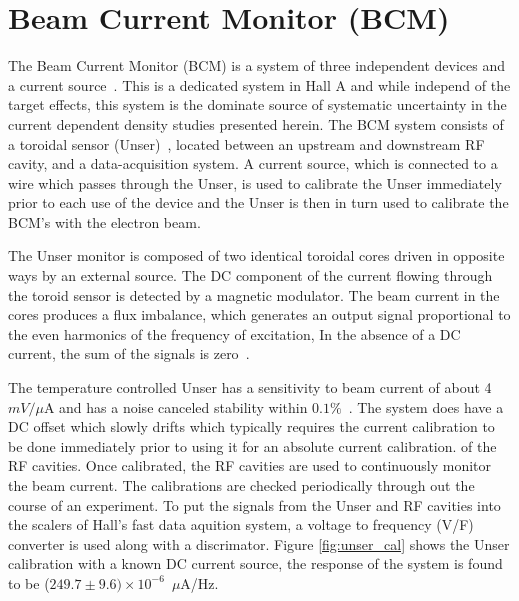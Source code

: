 \documentclass[final,5p,times,twocolumn]{elsarticle}
\begin{document}
\section{Beam Current Monitor (BCM)}
\label{BCM}

The Beam Current Monitor (BCM) is a system of three independent devices and a current source~\cite{Denard:2001zg}. 
This is a dedicated system in Hall A and while independ of the target effects, this system
is the dominate source of systematic uncertainty in the current dependent density studies presented
herein.  The BCM system consists of a toroidal sensor (Unser)~\cite{Unser:1991dr}, located between 
an upstream and downstream RF cavity, and a data-acquisition system.  A current source, which is connected to a wire which 
passes through the Unser, is used to calibrate the Unser immediately prior to each use of the device and
the Unser is then in turn used to calibrate the BCM's with the electron beam. 

The Unser monitor is composed of two identical toroidal cores driven in opposite ways by an external source.  
The DC component of the current flowing through the toroid sensor is detected by a magnetic modulator. The 
beam current in the cores produces a flux imbalance, which generates an output signal proportional to the 
even harmonics of the frequency of excitation, In the absence of a DC current, the sum of the signals is zero~\cite{Denard:2001zg}. 

The temperature controlled Unser has a sensitivity to beam current of about 4~$mV/\mu$A and has a noise canceled 
stability within $0.1\%$~\cite{Denard:2001zg}.  The system does have a DC offset which slowly drifts which typically 
requires the current calibration to be done immediately prior to using it for an absolute current calibration.
of the RF cavities.  Once calibrated, the RF cavities are used to continuously monitor the beam current. 
The calibrations are checked periodically through out the course of an experiment. 
To put the signals from the Unser and RF cavities into the scalers of Hall's fast data aquition system,
a voltage to frequency (V/F) converter is used along with a discrimator. 
Figure \ref{fig:unser_cal} shows the Unser calibration with a known DC current source, 
the response of the system is found to be ($249.7 \pm 9.6) \times 10^{-6}$~$\mu$A/Hz. 
\end{document}

